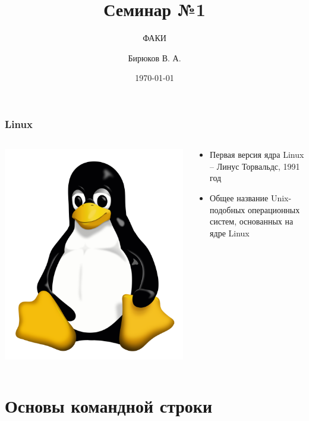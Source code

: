 \documentclass[12pt,pdf,hyperref={unicode}]{beamer}
\title{Семинар №1}
\subtitle{ФАКИ \the\year}
\author{Бирюков В. А.}
\date{\today}
\begin{document}
\begin{frame}
\titlepage
\end{frame} 

\begin{frame}
\frametitle{Linux} 
\begin{columns}
\begin{column}{0.4\textwidth}
   \includegraphics[width=0.75\linewidth]{tux.png}
\end{column}
\begin{column}{0.6\textwidth}  %
    \begin{itemize}
    \item Первая версия ядра Linux -- Линус Торвальдс, 1991 год
    \item Общее название Unix-подобных операционных систем, основанных на ядре Linux
    
    \end{itemize}
\end{column}
\end{columns}


\end{frame}

\section{Основы командной строки}
\end{document}

